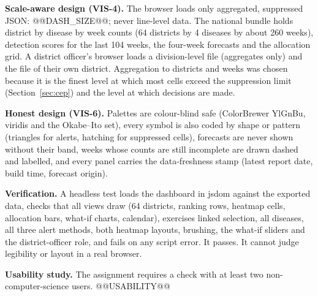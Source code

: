 \textbf{Scale-aware design (VIS-4).} The browser loads only aggregated, suppressed JSON: @@DASH_SIZE@@; never line-level data. The national bundle holds district by disease by week counts (64 districts by 4 diseases by about 260 weeks), detection scores for the last 104 weeks, the four-week forecasts and the allocation grid. A district officer's browser loads a division-level file (aggregates only) and the file of their own district. Aggregation to districts and weeks was chosen because it is the finest level at which most cells exceed the suppression limit (Section~\ref{sec:cep}) and the level at which decisions are made.

\textbf{Honest design (VIS-6).} Palettes are colour-blind safe (ColorBrewer YlGnBu, viridis and the Okabe--Ito set), every symbol is also coded by shape or pattern (triangles for alerts, hatching for suppressed cells), forecasts are never shown without their band, weeks whose counts are still incomplete are drawn dashed and labelled, and every panel carries the data-freshness stamp (latest report date, build time, forecast origin).

\textbf{Verification.} A headless test loads the dashboard in jsdom against the exported data, checks that all views draw (64 districts, ranking rows, heatmap cells, allocation bars, what-if charts, calendar), exercises linked selection, all diseases, all three alert methods, both heatmap layouts, brushing, the what-if sliders and the district-officer role, and fails on any script error. It passes. It cannot judge legibility or layout in a real browser.

\textbf{Usability study.} The assignment requires a check with at least two non-computer-science users. @@USABILITY@@
